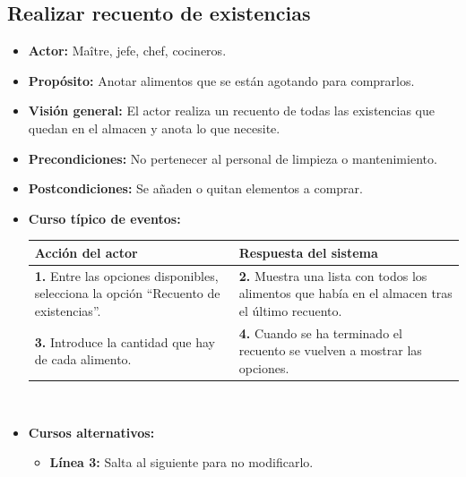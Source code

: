 \documentclass[spanish,a4paper,11pt, twoside]{report}	%
\begin{document}
	\subsection{Realizar recuento de existencias}
			\begin{itemize}
			\item \textbf{Actor:} Maître, jefe, chef, cocineros.
			\item \textbf{Propósito: } Anotar alimentos que se están agotando para comprarlos.
			\item \textbf{Visión general:} El actor realiza un
				recuento de todas las existencias que quedan en el almacen y anota lo que necesite.
			\item \textbf{Precondiciones:} No pertenecer al personal de limpieza o mantenimiento.
			\item \textbf{Postcondiciones:} Se añaden o quitan elementos a comprar.
			\item \textbf{Curso típico de eventos:} 	\\
				\begin{tabular}{|p{6cm}||p{6cm}|}
				\hline
				\textbf{Acción del actor} & \textbf{Respuesta del sistema} \\ \hline
				\textbf{1.} Entre las opciones disponibles, selecciona la opción ``Recuento de existencias''. & 
				\textbf{2.} Muestra una lista con todos los alimentos que había en el almacen tras el último recuento. \\ \hline
				\textbf{3.} Introduce la cantidad que hay de cada alimento. & 
				\textbf{4.} Cuando se ha terminado el recuento se vuelven a mostrar las opciones. \\ \hline
			\end{tabular}
			\\
			\item \textbf{Cursos alternativos:} 
			\begin{itemize}
				\item  \textbf{Línea 3:} Salta al siguiente para no
					modificarlo.
			\end {itemize}
		\end {itemize}
\end{document}

